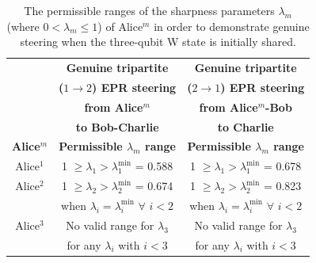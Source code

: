 \documentclass[pra,a4paper,aps,twocolumn,showpacs,superscriptaddress,groupedaddress]{revtex4}
\begin{document}
{\centering
	\begin{table}[t]\footnotesize
			\begin{tabular}{|c | c || c |} 
				\hline 
				& \textbf{Genuine tripartite} & \textbf{Genuine tripartite} \\
				& \textbf{($1 \rightarrow 2$) EPR steering} & \textbf{($2 \rightarrow 1$) EPR steering} \\
				& \textbf{from Alice$^m$} & \textbf{from Alice$^m$-Bob} \\
				& \textbf{to Bob-Charlie} & \textbf{to Charlie} \\
				\hline
				{\bf Alice$^m$} & {\bf Permissible $\lambda_{m}$ range}  & {\bf Permissible $\lambda_{m}$ range}  \\ [0.5ex] 
				\hline
				\hline
				Alice$^1$ & 1 $\geq \lambda_1 > \lambda_1^{\text{min}}$ = 0.588  & 1 $\geq \lambda_1 > \lambda_1^{\text{min}}$ =  0.678  \\ 
				\hline
				Alice$^2$ & 1 $\geq \lambda_2 > \lambda_2^{\text{min}}$ = 0.674  & 1 $\geq \lambda_2 > \lambda_2^{\text{min}}$ = 0.823 \\
				& when $\lambda_i = \lambda_i^{\text{min}}$ $\forall$ $i < 2$ & when $\lambda_i = \lambda_i^{\text{min}}$ $\forall$ $i < 2$ \\
				\hline
				Alice$^3$ & No valid range for $\lambda_3$ & No valid range for $\lambda_3$  \\
				& for any $\lambda_i$ with $i<3$ & for any $\lambda_i$ with $i<3$ \\[1ex]
				\hline
			\end{tabular}
			\caption{The permissible ranges of the sharpness parameters $\lambda_m$ (where $0 < \lambda_m \leq 1$) of Alice$^m$ in order to demonstrate genuine steering when the three-qubit W state  is initially shared.}
			\label{tab2}
	\end{table}
}



\end{document}
